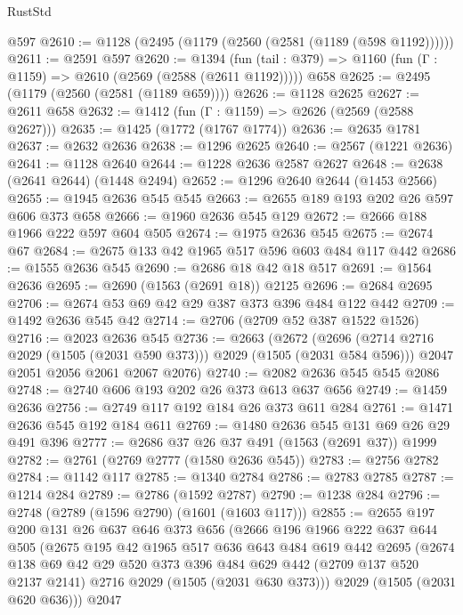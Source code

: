 \begin{lexlean}{RustStd}
\begin{coremodule}
    @597
@2610 := @1128 (@2495 (@1179 (@2560 (@2581 (@1189 (@598 @1192))))))
@2611 := @2591 @597
@2620 := @1394
    (fun (tail : @379) => @1160 (fun (Γ : @1159) => @2610 (@2569 (@2588 (@2611 @1192)))))
    @658
@2625 := @2495 (@1179 (@2560 (@2581 (@1189 @659))))
@2626 := @1128 @2625
@2627 := @2611 @658
@2632 := @1412 (fun (Γ : @1159) => @2626 (@2569 (@2588 @2627)))
@2635 := @1425 (@1772 (@1767 @1774))
@2636 := @2635 @1781
@2637 := @2632 @2636
@2638 := @1296 @2625
@2640 := @2567 (@1221 @2636)
@2641 := @1128 @2640
@2644 := @1228 @2636 @2587 @2627
@2648 := @2638 (@2641 @2644) (@1448 @2494)
@2652 := @1296 @2640 @2644 (@1453 @2566)
@2655 := @1945 @2636 @545 @545
@2663 := @2655 @189 @193 @202 @26 @597 @606 @373 @658
@2666 := @1960 @2636 @545 @129
@2672 := @2666 @188 @1966 @222 @597 @604 @505
@2674 := @1975 @2636 @545
@2675 := @2674 @67
@2684 := @2675 @133 @42 @1965 @517 @596 @603 @484 @117 @442
@2686 := @1555 @2636 @545
@2690 := @2686 @18 @42 @18 @517
@2691 := @1564 @2636
@2695 := @2690 (@1563 (@2691 @18)) @2125
@2696 := @2684 @2695
@2706 := @2674 @53 @69 @42 @29 @387 @373 @396 @484 @122 @442
@2709 := @1492 @2636 @545 @42
@2714 := @2706 (@2709 @52 @387 @1522 @1526)
@2716 := @2023 @2636 @545
@2736 := @2663
    (@2672
      (@2696 (@2714 @2716 @2029 (@1505 (@2031 @590 @373))) @2029 (@1505 (@2031 @584 @596)))
      @2047
      @2051
      @2056
      @2061
      @2067
      @2076)
@2740 := @2082 @2636 @545 @545 @2086
@2748 := @2740 @606 @193 @202 @26 @373 @613 @637 @656
@2749 := @1459 @2636
@2756 := @2749 @117 @192 @184 @26 @373 @611 @284
@2761 := @1471 @2636 @545 @192 @184 @611
@2769 := @1480 @2636 @545 @131 @69 @26 @29 @491 @396
@2777 := @2686 @37 @26 @37 @491 (@1563 (@2691 @37)) @1999
@2782 := @2761 (@2769 @2777 (@1580 @2636 @545))
@2783 := @2756 @2782
@2784 := @1142 @117
@2785 := @1340 @2784
@2786 := @2783 @2785
@2787 := @1214 @284
@2789 := @2786 (@1592 @2787)
@2790 := @1238 @284
@2796 := @2748 (@2789 (@1596 @2790) (@1601 (@1603 @117)))
@2855 := @2655
    @197
    @200
    @131
    @26
    @637
    @646
    @373
    @656
    (@2666
      @196
      @1966
      @222
      @637
      @644
      @505
      (@2675
        @195
        @42
        @1965
        @517
        @636
        @643
        @484
        @619
        @442
        @2695
        (@2674
          @138
          @69
          @42
          @29
          @520
          @373
          @396
          @484
          @629
          @442
          (@2709 @137 @520 @2137 @2141)
          @2716
          @2029
          (@1505 (@2031 @630 @373)))
        @2029
        (@1505 (@2031 @620 @636)))
      @2047

\end{coremodule}
\end{lexlean}
